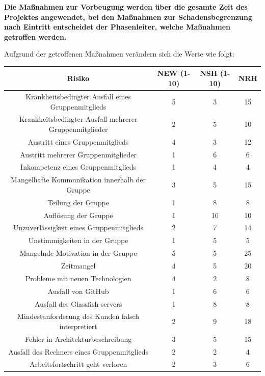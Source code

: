 \documentclass[fontsize=12pt,paper=a4,twoside]{scrartcl}
\begin{document}
\newpage
\textbf{Die Maßnahmen zur Vorbeugung werden über die gesamte Zeit des Projektes angewendet, bei den Maßnahmen zur Schadensbegrenzung nach Eintritt entscheidet der Phasenleiter, welche Maßnahmen getroffen werden.}\\
\bigskip 

Aufgrund der getroffenen Maßnahmen verändern sich die Werte wie folgt:\\
\begin{center}
\begin{tabular}{|c|c|c|c|} \hline
Risiko & NEW (1-10) & NSH (1-10) & NRH\\ \hline
Krankheitsbedingter Ausfall eines Gruppenmitglieds & 5 & 3 & 15\\ \hline
Krankheitsbedingter Ausfall mehrerer Gruppenmitglieder & 2 & 5 & 10\\ \hline
Austritt eines Gruppenmitglieds & 4 & 3 & 12\\ \hline
Austritt mehrerer Gruppenmitglieder & 1 & 6 & 6\\ \hline
Inkompetenz eines Gruppenmitglieds & 1 & 4 & 4\\ \hline
Mangelhafte Kommunikation innerhalb der Gruppe & 3 & 5 & 15\\ \hline
Teilung der Gruppe & 1 & 8 & 8\\ \hline
Auflösung der Gruppe & 1 & 10 & 10\\ \hline
Unzuverlässigkeit eines Gruppenmitglieds & 2 & 7 & 14\\ \hline
Unstimmigkeiten in der Gruppe & 1 & 5 & 5\\ \hline
Mangelnde Motivation in der Gruppe & 5 & 5 & 25\\ \hline
Zeitmangel & 4 & 5 & 20\\ \hline
Probleme mit neuen Technologien & 4 & 2 & 8\\ \hline
Ausfall von GitHub & 1 & 6 & 6\\ \hline
Ausfall des Glassfish-servers & 1 & 8 & 8\\ \hline
Mindestanforderung des Kunden falsch interpretiert & 2 & 9 & 18\\ \hline
Fehler in Architekturbeschreibung & 3 & 5 & 15\\ \hline
Ausfall des Rechners eines Gruppenmitglieds & 2 & 2 & 4\\ \hline
Arbeitsfortschritt geht verloren & 2 & 3 & 6\\ \hline
\end{tabular}
\end{center}
\end{document}
